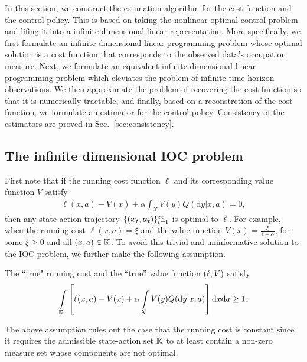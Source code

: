 In this section, we construct the estimation algorithm for the cost function and the control policy. 
This is based on taking the nonlinear optimal control problem and lifing it into a infinite dimensional linear representation. 
More specifically, we first formulate an infinite dimensional linear programming problem whose optimal solution is a cost function that corresponds to the observed data's occupation measure.
Next, we formulate an equivalent infinite dimensional linear programming problem which eleviates the problem of infinite time-horizon observations.
We then approximate the problem of recovering the cost function so that it is numerically tractable, and finally, based on a reconstrction of the cost function, we formulate an estimator for the control policy. Consistency of the estimators are proved in Sec.~\ref{sec:consistency}.


\subsection{The infinite dimensional IOC problem}
First note that if the running cost function $\ell$ and its corresponding value function $V$ satisfy
\begin{align*}
  \ell(x,a)-V(x)+\alpha\int_X V(y)Q(\mathrm dy|x,a) = 0,
\end{align*}
then any state-action trajectory $\{(\bm{x}_t,\bm{a}_t)\}_{t=1}^\infty$ is optimal to $\ell$.
For example, when the running cost $\ell(x,a)=\xi$ and the value function $V(x) = \frac{\xi}{1-\alpha}$, for some $\xi\geq0$ and all $(x,a)\in\mathbb{K}$.
To avoid this trivial and uninformative solution to the IOC problem, we further make the following assumption.
\begin{assumption}\label{ass:IOC_normalization}
The ``true" running cost and the ``true'' value function $(\relax{\ell},\relax{V})$ satisfy
\[
\int_{\mK}\left[\elltrue(x,a)-\Vtrue(x)+\alpha\int_X \Vtrue(y)Q(\mathrm dy|x,a)\right]\mathrm dx \mathrm da\ge 1.
\]
\end{assumption}
The above assumption rules out the case that the running cost is constant since it requires the admissible state-action set $\mathbb{K}$ to at least contain a non-zero measure set whose components are not optimal.


